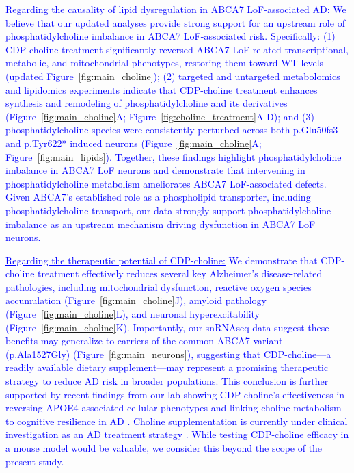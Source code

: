 \textcolor{blue}{\underline{Regarding the causality of lipid dysregulation in ABCA7 LoF-associated AD:} We believe that our updated analyses provide strong support for an upstream role of phosphatidylcholine imbalance in ABCA7 LoF-associated risk. Specifically: (1) CDP-choline treatment significantly reversed ABCA7 LoF-related transcriptional, metabolic, and mitochondrial phenotypes, restoring them toward WT levels (updated Figure~\ref{fig:main_choline}); (2) targeted and untargeted metabolomics and lipidomics experiments indicate that CDP-choline treatment enhances synthesis and remodeling of phosphatidylcholine and its derivatives (Figure~\ref{fig:main_choline}A; Figure~\ref{fig:choline_treatment}A-D); and (3) phosphatidylcholine species were consistently perturbed across both p.Glu50fs3 and p.Tyr622* induced neurons (Figure~\ref{fig:main_choline}A; Figure~\ref{fig:main_lipids}). Together, these findings highlight phosphatidylcholine imbalance in ABCA7 LoF neurons and demonstrate that intervening in phosphatidylcholine metabolism ameliorates ABCA7 LoF-associated defects. Given ABCA7’s established role as a phospholipid transporter, including phosphatidylcholine transport, our data strongly support phosphatidylcholine imbalance as an upstream mechanism driving dysfunction in ABCA7 LoF neurons.}

\textcolor{blue}{\underline{Regarding the therapeutic potential of CDP-choline:} We demonstrate that CDP-choline treatment effectively reduces several key Alzheimer’s disease-related pathologies, including mitochondrial dysfunction, reactive oxygen species accumulation (Figure~\ref{fig:main_choline}J), amyloid pathology (Figure~\ref{fig:main_choline}L), and neuronal hyperexcitability (Figure~\ref{fig:main_choline}K). Importantly, our snRNAseq data suggest these benefits may generalize to carriers of the common ABCA7 variant (p.Ala1527Gly) (Figure~\ref{fig:main_neurons}), suggesting that CDP-choline—a readily available dietary supplement—may represent a promising therapeutic strategy to reduce AD risk in broader populations. This conclusion is further supported by recent findings from our lab showing CDP-choline’s effectiveness in reversing APOE4-associated cellular phenotypes \cite{Sienski2021-zt} and linking choline metabolism to cognitive resilience in AD \cite{Mathys2024-ex}. Choline supplementation is currently under clinical investigation as an AD treatment strategy \cite{Cummings2024-cu}. While testing CDP-choline efficacy in a mouse model would be valuable, we consider this beyond the scope of the present study.}

